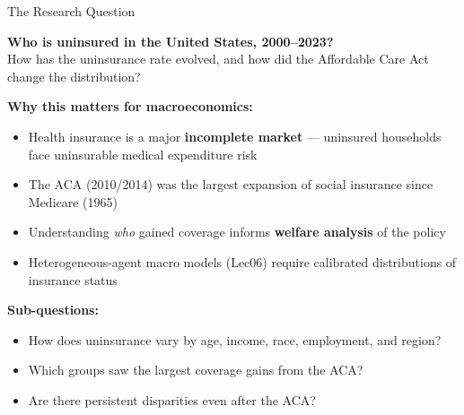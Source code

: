 \documentclass[10pt,english,aspectratio=169]{beamer}
\begin{document}
\begin{frame}{The Research Question}

\begin{tcolorbox}[colback=blue!3, colframe=RedTitle!60]
\textbf{Who is uninsured in the United States, 2000--2023?}\\
How has the uninsurance rate evolved, and how did the Affordable Care Act change the distribution?
\end{tcolorbox}

\vspace{0.3cm}
\textbf{Why this matters for macroeconomics:}
\begin{itemize}
    \item Health insurance is a major \textbf{incomplete market} --- uninsured households face uninsurable medical expenditure risk
    \item The ACA (2010/2014) was the largest expansion of social insurance since Medicare (1965)
    \item Understanding \emph{who} gained coverage informs \textbf{welfare analysis} of the policy
    \item Heterogeneous-agent macro models (Lec06) require calibrated distributions of insurance status
\end{itemize}

\vspace{0.3cm}
\textbf{Sub-questions:}
\begin{itemize}
    \item How does uninsurance vary by age, income, race, employment, and region?
    \item Which groups saw the largest coverage gains from the ACA?
    \item Are there persistent disparities even after the ACA?
\end{itemize}

\end{frame}
\end{document}
